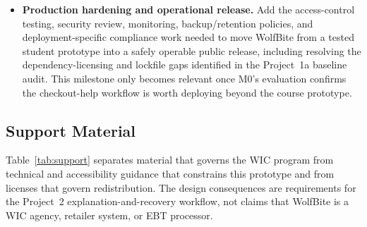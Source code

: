 \documentclass[sigconf]{acmart}
\begin{document}
\begin{itemize}
  \item \textbf{Production hardening and operational release.}
  Add the access-control testing, security review, monitoring,
  backup/retention policies, and deployment-specific compliance work needed to
  move WolfBite from a tested student prototype into a safely operable public
  release, including resolving the dependency-licensing and lockfile gaps
  identified in the Project~1a baseline audit. This milestone only becomes
  relevant once M0's evaluation confirms the checkout-help workflow is worth
  deploying beyond the course prototype.
\end{itemize}

\subsection{Support Material}

Table~\ref{tab:support} separates material that governs the WIC program from
technical and accessibility guidance that constrains this prototype and from
licenses that govern redistribution.  The design consequences are requirements
for the Project~2 explanation-and-recovery workflow, not claims that WolfBite
is a WIC agency, retailer system, or EBT processor.
\end{document}
